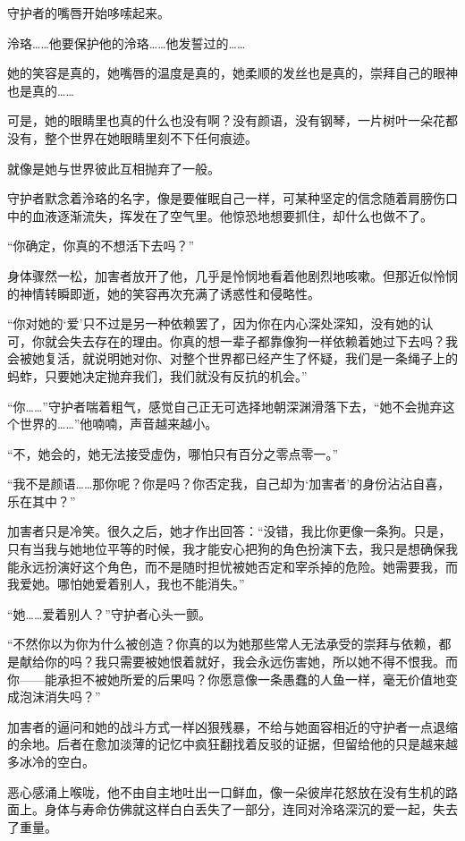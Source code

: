 \documentclass[UTF8, scheme = chinese, openany]{ctexbook}
\begin{document}
守护者的嘴唇开始哆嗦起来。

泠珞……他要保护他的泠珞……他发誓过的……

她的笑容是真的，她嘴唇的温度是真的，她柔顺的发丝也是真的，崇拜自己的眼神也是真的……

可是，她的眼睛里也真的什么也没有啊？没有颜语，没有钢琴，一片树叶一朵花都没有，整个世界在她眼睛里刻不下任何痕迹。

就像是她与世界彼此互相抛弃了一般。

守护者默念着泠珞的名字，像是要催眠自己一样，可某种坚定的信念随着肩膀伤口中的血液逐渐流失，挥发在了空气里。他惊恐地想要抓住，却什么也做不了。

“你确定，你真的不想活下去吗？”

身体骤然一松，加害者放开了他，几乎是怜悯地看着他剧烈地咳嗽。但那近似怜悯的神情转瞬即逝，她的笑容再次充满了诱惑性和侵略性。

“你对她的‘爱’只不过是另一种依赖罢了，因为你在内心深处深知，没有她的认可，你就会失去存在的理由。你真的想一辈子都靠像狗一样依赖着她过下去吗？我会被她复活，就说明她对你、对整个世界都已经产生了怀疑，我们是一条绳子上的蚂蚱，只要她决定抛弃我们，我们就没有反抗的机会。”

“你……”守护者喘着粗气，感觉自己正无可选择地朝深渊滑落下去，“她不会抛弃这个世界的……”他喃喃，声音越来越小。

“不，她会的，她无法接受虚伪，哪怕只有百分之零点零一。”

“我不是颜语……那你呢？你是吗？你否定我，自己却为‘加害者’的身份沾沾自喜，乐在其中？”

加害者只是冷笑。很久之后，她才作出回答：“没错，我比你更像一条狗。只是，只有当我与她地位平等的时候，我才能安心把狗的角色扮演下去，我只是想确保我能永远扮演好这个角色，而不是随时担忧被她否定和宰杀掉的危险。她需要我，而我爱她。哪怕她爱着别人，我也不能消失。”

“她……爱着别人？”守护者心头一颤。

“不然你以为你为什么被创造？你真的以为她那些常人无法承受的崇拜与依赖，都是献给你的吗？我只需要被她恨着就好，我会永远伤害她，所以她不得不恨我。而你——能承担不被她所爱的后果吗？你愿意像一条愚蠢的人鱼一样，毫无价值地变成泡沫消失吗？”

加害者的逼问和她的战斗方式一样凶狠残暴，不给与她面容相近的守护者一点退缩的余地。后者在愈加淡薄的记忆中疯狂翻找着反驳的证据，但留给他的只是越来越多冰冷的空白。

恶心感涌上喉咙，他不由自主地吐出一口鲜血，像一朵彼岸花怒放在没有生机的路面上。身体与寿命仿佛就这样白白丢失了一部分，连同对泠珞深沉的爱一起，失去了重量。
\end{document}
